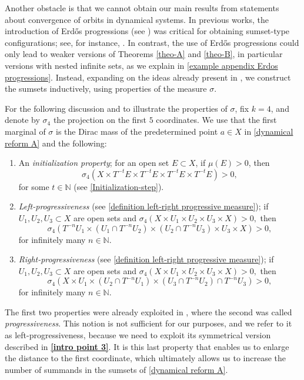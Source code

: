 \documentclass[letter, 11pt]{article}
\theoremstyle{definition}
\theoremstyle{plain}
\newcommand{\N}{\mathbb{N}}
\newcommand{\1}{\mathbbm{1}}
\begin{document}
Another obstacle is that we cannot obtain our main results from statements about convergence of orbits in dynamical systems. In previous works, the introduction of Erd\H{o}s progressions (see \cite[Definition 2.1]{kmrr25}) was critical for obtaining sumset-type configurations; see, for instance, \cite{ackelsberg2025polynomial_patterns_rationals,ackelsberg_jamnesham2025equidistribution,charamaras_kousek_mountakis_radic2025BBingroups,Charamaras_Mountakis_2025,kousek2025asymmetric,kousek_radic2025BB,Kra_Moreira_Richter_Robertson:2022,kmrr25,Moreira_Richter_Robertson19}. In contrast, the use of Erd\H{o}s progressions could only lead to weaker versions of Theorems \ref{theo-A} and \ref{theo-B}, in particular versions with nested infinite sets, as we explain in \cref{example appendix Erdos progressions}. Instead, expanding on the ideas already present in \cite{hernandez2025infinite}, we construct the sumsets inductively, using properties of the measure $\sigma$. 

For the following discussion and to illustrate the properties of $\sigma$, fix $k= 4$, and denote by $\sigma_4$ the projection on the first $5$ coordinates. We use that the first marginal of $\sigma$ is the Dirac mass of the predetermined point $a\in X$ in \cref{dynamical reform A} and the following:
\begin{enumerate}
    \item \label{intro point 1} An \textit{initialization property}; for an open set $E\subset X$, if $\mu(E)>0$, then  $$\sigma_4(X\times T^{-t}E \times T^{-t}E \times T^{-t}E  \times T^{-t}E)>0 ,$$ for some $t\in \N$ (see \cref{Initialization-step}).
    \item \label{intro point 2} \textit{Left-progressiveness} (see \cref{definition left-right progressive measure}); if $U_1,U_2,U_3\subset X$ are open sets and
    $\sigma_4(X\times U_1\times U_2\times U_3 \times X)>0 ,$ then $$\sigma_4(T^{-n}U_1\times (U_1 \cap T^{-n}U_2)\times (U_2\cap T^{-n}U_3)\times U_3 \times X)>0, $$
    for infinitely many $n\in \N$.
    \item \label{intro point 3} \textit{Right-progressiveness} (see \cref{definition left-right progressive measure}); if $U_1,U_2,U_3\subset X$ are open sets and
    $\sigma_4(X\times U_1\times U_2\times U_3 \times X)>0 ,$ then $$\sigma_4(X\times U_1 \times (U_2\cap T^{-n}U_1)\times (U_3\cap T^{-n}U_2) \cap T^{-n}U_3 )>0, $$
    for infinitely many $n\in \N$.
\end{enumerate}
The first two properties were already exploited in \cite{kmrr25}, where
the second was called \emph{progressiveness}. This notion is not sufficient 
for our purposes, and we refer to it as left-progressiveness, because we 
need to exploit its symmetrical version described in \textbf{\ref{intro point 3}}. 
It is this last property that enables us to enlarge the distance to the first 
coordinate, which ultimately allows us to increase the number of summands in the 
sumsets of \cref{dynamical reform A}.
\end{document}
